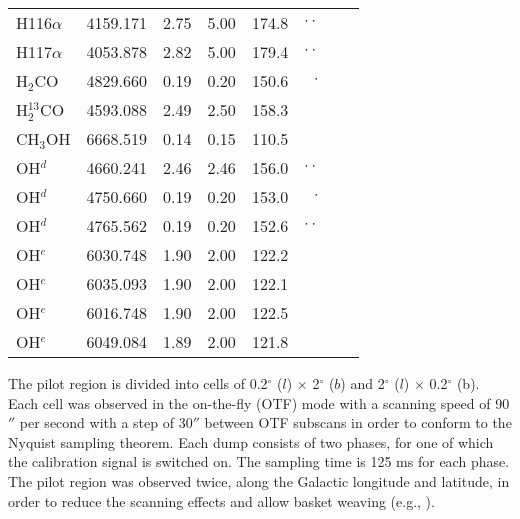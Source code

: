\documentclass{aa}
\begin{document}
\begin{table}[h]
\begin{tabular}{lrrrrrrc}
 H116$\alpha$ & 4159.171 & 2.75 &5.00 &174.8 &$\cdot\cdot$ \\ 
 H117$\alpha$ & 4053.878 & 2.82 &5.00 &179.4 &$\cdot\cdot$ \\ 
 H$_2$CO & 4829.660 & 0.19 &0.20 &150.6 &$\cdot$ \\ 
 H$_2^{13}$CO & 4593.088 & 2.49 &2.50 &158.3 & \\ 
 CH$_3$OH & 6668.519 & 0.14 &0.15 &110.5 & \\ 
 OH$^{d}$ & 4660.241 & 2.46  &2.46 &156.0 &$\cdot\cdot$ \\ 
 OH$^{d}$ & 4750.660 & 0.19  &0.20 &153.0 &$\cdot$ \\ 
 OH$^{d}$ & 4765.562 & 0.19  &0.20 &152.6 &$\cdot\cdot$ \\ 
 OH$^{e}$ & 6030.748 & 1.90  &2.00 &122.2 & \\ 
 OH$^{e}$ & 6035.093 & 1.90  &2.00 &122.1 & \\ 
 OH$^{e}$ & 6016.748 & 1.90  &2.00 &122.5 & \\ 
 OH$^{e}$ & 6049.084 & 1.89  &2.00 &121.8 & \\ 
 
\hline
\hline
\end{tabular}
\end{table}

The pilot region is divided into cells of 0.2$^\circ$ ($l$) $\times$ 2$^\circ$ ($b$) and 2$^\circ$ ($l$) $\times$ 0.2$^\circ$ (b). Each cell was observed in the on-the-fly (OTF) mode with a scanning speed of 90$''$ per second with a step of 30$''$ between OTF subscans in order to conform to the Nyquist sampling theorem. Each dump consists of two phases, for one of which the calibration signal is switched on. The sampling time is 125 ms for each phase. The pilot region was observed twice, along the Galactic longitude and latitude, in order to reduce the scanning effects and allow basket weaving (e.g., \citealp{Winkel2012}). 
\end{document}
